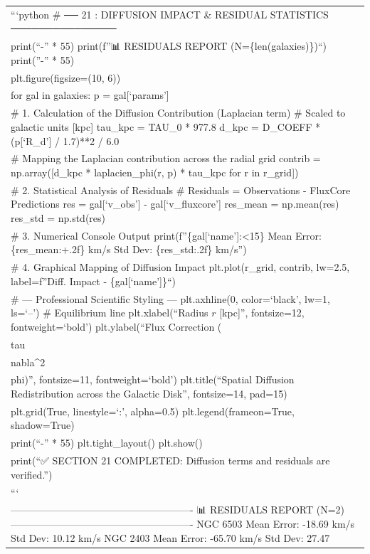 \documentclass[
]{article}
\begin{document}
{\begin{longtable}[]{@{}
  >{\raggedright\arraybackslash}p{}@{}}
```python \# ── 21 : DIFFUSION IMPACT \& RESIDUAL STATISTICS
─────────────── \\
print(``-'' * 55) print(f''📊 RESIDUALS REPORT (N=\{len(galaxies)\})``)
print(''-'' * 55) \\
plt.figure(figsize=(10, 6)) \\
for gal in galaxies: p = gal{[}`params'{]} \\
\# 1. Calculation of the Diffusion Contribution (Laplacian term) \#
Scaled to galactic units {[}kpc{]} tau\_kpc = TAU\_0 * 977.8 d\_kpc =
D\_COEFF * (p{[}`R\_d'{]} / 1.7)**2 / 6.0 \\
\# Mapping the Laplacian contribution across the radial grid contrib =
np.array({[}d\_kpc * laplacien\_phi(r, p) * tau\_kpc for r in
r\_grid{]}) \\
\# 2. Statistical Analysis of Residuals \# Residuals = Observations -
FluxCore Predictions res = gal{[}`v\_obs'{]} - gal{[}`v\_fluxcore'{]}
res\_mean = np.mean(res) res\_std = np.std(res) \\
\# 3. Numerical Console Output print(f''\{gal{[}`name'{]}:\textless15\}
\textbar{} Mean Error: \{res\_mean:+.2f\} km/s \textbar{} Std Dev:
\{res\_std:.2f\} km/s'') \\
\# 4. Graphical Mapping of Diffusion Impact plt.plot(r\_grid, contrib,
lw=2.5, label=f''Diff. Impact - \{gal{[}`name'{]}\}``) \\
\# --- Professional Scientific Styling --- plt.axhline(0, color=`black',
lw=1, ls=`--') \# Equilibrium line plt.xlabel(``Radius \(r\)
{[}kpc{]}'', fontsize=12, fontweight=`bold') plt.ylabel(``Flux
Correction (\(D \\tau \\nabla^2 \\phi\))'', fontsize=11,
fontweight=`bold') plt.title(``Spatial Diffusion Redistribution across
the Galactic Disk'', fontsize=14, pad=15) \\
plt.grid(True, linestyle=`:', alpha=0.5) plt.legend(frameon=True,
shadow=True) \\
print(``-'' * 55) plt.tight\_layout() plt.show() \\
print(``✅ SECTION 21 COMPLETED: Diffusion terms and residuals are
verified.'') \\
``` \\
------------------------------------------------------- 📊 RESIDUALS
REPORT (N=2) ------------------------------------------------------- NGC
6503 \textbar{} Mean Error: -18.69 km/s \textbar{} Std Dev: 10.12 km/s
NGC 2403 \textbar{} Mean Error: -65.70 km/s \textbar{} Std Dev: 27.47

\end{longtable}}
\end{document}
